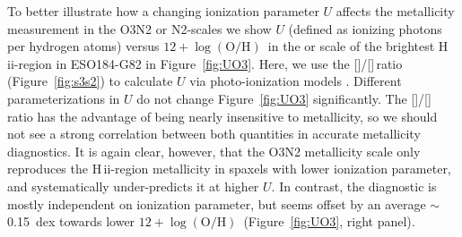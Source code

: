 \documentclass[traditabstract]{aa}
\newcommand{\hii}{\mbox{H\,{\sc ii}}}
\newcommand{\oh}{$12+\log(\mathrm{O/H})$}
\newcommand{\sii}{[\ion{S}{ii}]}
\newcommand{\siii}{[\ion{S}{iii}]}
\begin{document}
\begin{appendix}
To better illustrate how a changing ionization parameter $U$ affects the metallicity measurement in the O3N2 or N2-scales we show $U$ (defined as ionizing photons per hydrogen atoms) versus \oh\, in the \citet{2004MNRAS.348L..59P} or \citet{2016Ap&SS.361...61D} scale of the brightest \hii-region in ESO184-G82 in Figure~\ref{fig:UO3}. Here, we use the \sii/\siii\,ratio (Figure~\ref{fig:s3s2}) to calculate $U$ via photo-ionization models \citep{2011MNRAS.415.3616D}. Different parameterizations in $U$ \citep[e.g.][]{2016A&A...594A..37M} do not change Figure~\ref{fig:UO3} significantly. The \sii/\siii\,ratio has the advantage of being nearly insensitive to metallicity, so we should not see a strong correlation between both quantities in accurate metallicity diagnostics. It is again clear, however, that the O3N2 metallicity scale only reproduces the \hii-region metallicity in spaxels with lower ionization parameter, and systematically under-predicts it at higher $U$. In contrast, the \citet{2016Ap&SS.361...61D} diagnostic is mostly independent on ionization parameter, but seems offset by an average $\sim$0.15~dex towards lower \oh\, (Figure~\ref{fig:UO3}, right panel).

\end{appendix}
\end{document}
